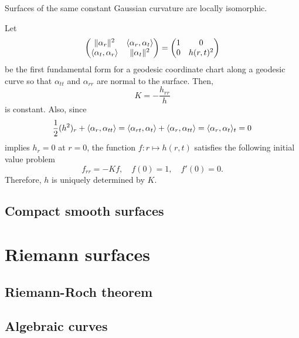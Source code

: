 \documentclass{../../large}
\begin{document}
\begin{prb}
Surfaces of the same constant Gaussian curvature are locally isomorphic.
\end{prb}
\begin{pf}
Let
\[\begin{pmatrix}\|\alpha_r\|^2&\langle\alpha_r,\alpha_t\rangle\\\langle\alpha_t,\alpha_r\rangle&\|\alpha_t\|^2\end{pmatrix}=\begin{pmatrix}1&0\\0&h(r,t)^2\end{pmatrix}\]
be the first fundamental form for a geodesic coordinate chart along a geodesic curve so that $\alpha_{tt}$ and $\alpha_{rr}$ are normal to the surface.
Then,
\[K=-\frac{h_{rr}}h\]
is constant.
Also, since
\[\frac12(h^2)_r+\langle\alpha_r,\alpha_{tt}\rangle=\langle\alpha_{rt},\alpha_t\rangle+\langle\alpha_r,\alpha_{tt}\rangle=\langle\alpha_r,\alpha_t\rangle_t=0\]
implies $h_r=0$ at $r=0$, the function $f:r\mapsto h(r,t)$ satisfies the following initial value problem
\[f_{rr}=-Kf,\quad f(0)=1,\quad f'(0)=0.\]
Therefore, $h$ is uniquely determined by $K$.
\end{pf}



\chapter{Compact smooth surfaces}


















\part{Riemann surfaces}

\chapter{Riemann-Roch theorem}

\chapter{Algebraic curves}
\end{document}
